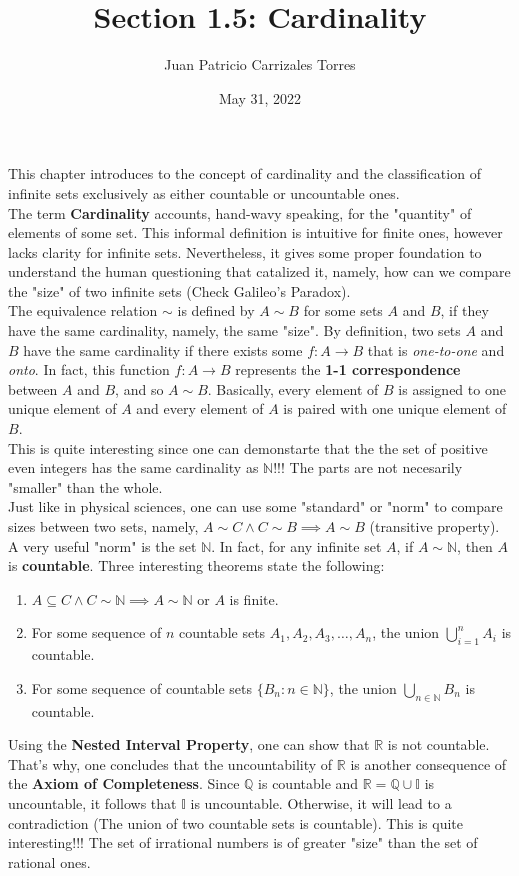 \documentclass[12pt]{article}
\newcommand{\N}{\mathbb{N}}
\newcommand{\R}{\mathbb{R}}
\newcommand{\Q}{\mathbb{Q}}
\begin{document}
 
	
	\title{Section 1.5: Cardinality}
	\author{Juan Patricio Carrizales Torres}
	\date{May 31, 2022}
	\maketitle
	
	This chapter introduces to the concept of cardinality and the classification of infinite sets exclusively as either countable or uncountable ones. \\
	The term \textbf{Cardinality} accounts, hand-wavy speaking, for the "quantity" of elements of some set. This informal definition is intuitive for finite ones, however lacks clarity for infinite sets. Nevertheless, it gives some proper foundation to understand the human questioning that catalized it, namely, how can we compare the "size" of two infinite sets (Check Galileo's Paradox).\\
	 
	The equivalence relation $\sim$ is defined by $A\sim B$ for some sets $A$ and $B$, if they have the same cardinality, namely, the same "size". By definition, two sets $A$ and $B$ have the same cardinality if there exists some $f: A\to B$ that is \textit{one-to-one} and \textit{onto}. In fact, this function $f: A\to B$ represents the \textbf{1-1 correspondence} between $A$ and $B$, and so $A\sim B$. Basically, every element of $B$ is assigned to one unique element of $A$ and every element of $A$ is paired with one unique element of $B$. \\
	
	This is quite interesting since one can demonstarte that the the set of positive even integers has the same cardinality as $\N$!!! The parts are not necesarily "smaller" than the whole. \\  
	
	 Just like in physical sciences, one can use some "standard" or "norm" to compare sizes between two sets, namely, $A\sim C \wedge C\sim B \implies A\sim B$ (transitive property). A very useful "norm" is the set $\N$. In fact, for any infinite set $A$, if $A\sim \N$, then $A$ is \textbf{countable}. Three interesting theorems state the following:
	 \begin{enumerate}[label=(\alph*)]
	 	\item $A\subseteq C \wedge C\sim \N \implies A\sim \N $ or $A$ is finite.  
	 	\item For some sequence of $n$ countable sets $A_{1}, A_{2}, A_{3},\ldots, A_{n}$, the union $\bigcup_{i=1}^{n} A_{i}$ is countable.
	 	\item For some sequence of countable sets $\{B_{n}:n\in \N\}$, the union $\bigcup_{n\in \N} B_{n}$ is countable.
	 \end{enumerate}
 	Using the \textbf{Nested Interval Property}, one can show that $\R$ is not countable. That's why, one concludes that the uncountability of $\R$ is another consequence of the \textbf{Axiom of Completeness}. Since $\Q$ is countable and $\R = \Q\cup \mathbb{I}$ is uncountable, it follows that $\mathbb{I}$ is uncountable. Otherwise, it will lead to a contradiction (The union of two countable sets is countable). This is quite interesting!!! The set of irrational numbers is of greater "size" than the set of rational ones.  
	
\end{document}
